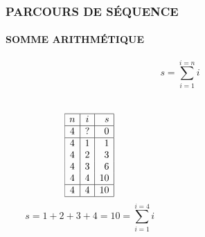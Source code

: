\begin{frame}
\frametitle{\uppercase{Parcours de séquence}}
\framesubtitle{\uppercase{Somme arithmétique}}
$$s = \sum_{i=1}^{i=n} i$$

\begin{columns}\tt
\column{5.25cm}

\column{5.25cm}
$$\begin{array}{|c|c|r|}
\hline
n & i & s \\
\hline
4 & ? & 0 \\\hline
4 & 1 & 1 \\%
4 & 2 & 3 \\%
4 & 3 & 6 \\%
4 & 4 & 10 \\\hline
4 & 4 & 10 \\
\hline
\end{array}$$
$$s = 1 + 2 + 3 + 4 = 10 = \sum_{i=1}^{i=4} i$$

\end{columns}

\end{frame}
\note{
\mbox{}\null\vfill

}



